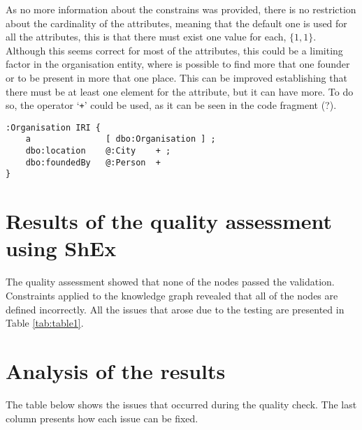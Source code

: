 \documentclass[11pt]{article}
\begin{document}
As no more information about the constrains was provided, there is no restriction about the cardinality of the attributes, meaning that the default one is used for all the attributes, this is that there must exist one value for each, $\{1, 1\}$. Although this seems correct for most of the attributes, this could be a limiting factor in the organisation entity, where is possible to find more that one founder or to be present in more that one place. This can be improved establishing that there must be at least one element for the attribute, but it can have more. To do so, the operator `\texttt{+}' could be used, as it can be seen in the code fragment (?).

\newpage
\begin{lstlisting}[caption=organisation with cardinal improvement,frame=single,label={lst:cardinality},xleftmargin=.2\textwidth,xrightmargin=.2\textwidth]
:Organisation IRI {
    a               [ dbo:Organisation ] ;
    dbo:location    @:City    + ;
    dbo:foundedBy   @:Person  +
}
\end{lstlisting}

\section{Results of the quality assessment using ShEx}
The quality assessment showed that none of the nodes passed the validation. Constraints applied to the knowledge graph revealed that all of the nodes are defined incorrectly. All the issues that arose due to the testing are presented in Table \ref{tab:table1}.



\section{Analysis of the results}

The table below shows the issues that occurred during the quality check. The last column presents how each issue can be fixed.
\end{document}
